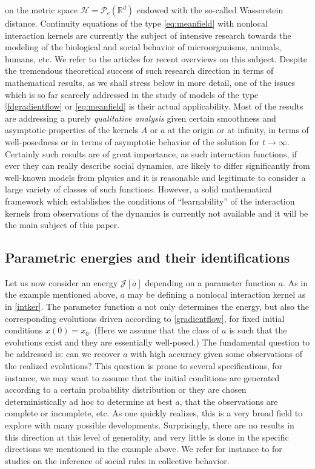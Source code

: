 on the metric space $\mathcal H =\mathcal P_c(\mathbb R^d)$ endowed with the so-called Wasserstein distance. Continuity equations of the type \eqref{eq:meanfield} with nonlocal interaction kernels are currently the subject of intensive research  towards the modeling of the biological and social behavior of microorganisms, animals, humans, etc. We refer to the  articles \cite{cafotove10,13-Carrillo-Choi-Hauray-MFL} for recent overviews on this subject. Despite the tremendous theoretical success of such research direction in terms of mathematical results, as we shall stress below in more detail, one of the issues which is so far scarcely addressed in the study of models of the type \eqref{fdgradientflow} or \eqref{eq:meanfield} is their actual applicability. Most of the results are addressing a purely {\it qualitative analysis} given certain smoothness and asymptotic properties of the kernels $A$ or $a$ at the origin or at infinity, in terms of well-posedness or in terms of asymptotic behavior of the solution for $t \to \infty$.  Certainly such results are of great importance, as such interaction functions, if ever they can really describe social dynamics,  are likely to differ significantly from well-known models from physics and it is reasonable and legitimate to consider a large variety of classes of such functions.
However, a solid mathematical framework which establishes the conditions of ``learnability'' of the interaction kernels from observations of the dynamics is currently not available and it will be the main subject of this paper.

\subsection{Parametric energies and their identifications}

Let us now consider an energy $\mathcal J[a]$ depending on a parameter function $a$. As in the example mentioned above, $a$ may be defining a nonlocal interaction kernel as in  \eqref{intker}. The parameter function $a$ not only determines the energy, but also the corresponding evolutions driven according to \eqref{gradientflow}, for fixed initial conditions $x(0)=x_0$. (Here we assume that the class of $a$ is such that the evolutions exist and they are essentially well-posed.)
The fundamental question to be addressed is: can we recover $a$ with high accuracy given some observations of the realized evolutions? This question is prone to several specifications, for instance, we may want to assume that the initial conditions are generated according to a certain probability distribution or they are chosen deterministically ad hoc to determine at best $a$, that the observations are complete or incomplete, etc. As one  quickly realizes, this is a very broad field to explore with many possible developments. Surprisingly, there are no results in this direction at this level of generality, and very little is done in the specific directions we mentioned in the example above. We refer for instance to \cite{mann11,heoemascszwa11} for studies on the inference of social rules in collective behavior. 

